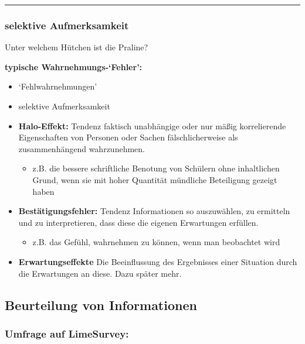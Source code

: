\documentclass[
]{book}
\providecommand{\tightlist}{%
  \setlength{\itemsep}{0pt}\setlength{\parskip}{0pt}}
\begin{document}
\begin{center}\rule{0.5\linewidth}{0.5pt}\end{center}

\hypertarget{selektive-aufmerksamkeit}{%
\subsubsection{selektive Aufmerksamkeit}\label{selektive-aufmerksamkeit}}

Unter welchem Hütchen ist die Praline?

\textbf{typische Wahrnehmungs-`Fehler':}

\begin{itemize}
\item
  `Fehlwahrnehmungen'
\item
  selektive Aufmerksamkeit
\item
  \textbf{Halo-Effekt:} Tendenz faktisch unabhängige oder nur mäßig korrelierende Eigenschaften von Personen oder Sachen
  fälschlicherweise als zusammenhängend wahrzunehmen.

  \begin{itemize}
  \tightlist
  \item
    z.B. die bessere schriftliche Benotung von Schülern ohne inhaltlichen Grund, wenn sie mit hoher Quantität mündliche Beteiligung gezeigt haben
  \end{itemize}
\item
  \textbf{Bestätigungsfehler:} Tendenz Informationen so auszuwählen, zu ermitteln und zu interpretieren, dass diese die
  eigenen Erwartungen erfüllen.

  \begin{itemize}
  \tightlist
  \item
    z.B. das Gefühl, wahrnehmen zu können, wenn man beobachtet wird
  \end{itemize}
\item
  \textbf{Erwartungseffekte} Die Beeinflussung des Ergebnisses einer Situation durch die Erwartungen an diese. Dazu später mehr.
\end{itemize}

\hypertarget{beurteilung-von-informationen}{%
\subsection{Beurteilung von Informationen}\label{beurteilung-von-informationen}}

\hypertarget{umfrage-auf-limesurvey}{%
\subsubsection{Umfrage auf LimeSurvey:}\label{umfrage-auf-limesurvey}}
\end{document}
